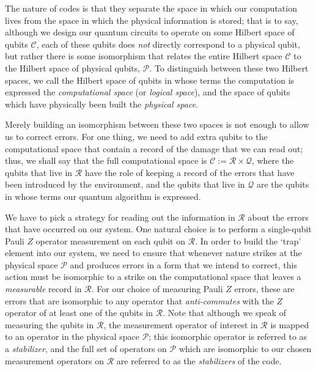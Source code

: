 \documentclass[12pt]{amsbook}
\theoremstyle{plain}
\theoremstyle{definition}
\theoremstyle{remark}
\begin{document}
The nature of codes is that they separate the space in which our computation lives from the space in which the physical information is
stored; that is to say, although we design our quantum circuits to operate on some Hilbert space of qubits $\mathscr{C}$, each of these qubits
does \emph{not} directly correspond to a physical qubit, but rather there is some isomorphism that relates the entire Hilbert space $\mathscr{C}$
to the Hilbert space of physical qubits, $\mathscr{P}$.  To distinguish between these two Hilbert spaces, we call the Hilbert space of qubits in whose terms the computation is expressed the \emph{computational space} (or \emph{logical space}), and the space of qubits which have physically been built the
\emph{physical space}.

Merely building an isomorphism between these two spaces is not enough to allow us to correct errors.  For one thing, we need to add extra qubits to the computational space that contain a record of the damage that we can read out; thus, we shall say that the full computational space is $\mathscr{C}:=\mathscr{R}\times\mathscr{Q}$, where the qubits that live in $\mathscr{R}$ have the role of keeping a
record of the errors that have been introduced by the environment, and the qubits that live in $\mathscr{Q}$ are the qubits in whose terms our quantum
algorithm is expressed.  

We have to pick a strategy for reading out the information in $\mathscr{R}$ about the errors that have occurred on our system.  One natural choice is to perform a single-qubit Pauli $Z$ operator measurement on each qubit on $\mathscr{R}$.  In order to build the `trap' element into our system, we need to ensure that whenever nature strikes at the physical space $\mathscr{P}$ and produces errors in a form that we intend to correct, this action must be isomorphic to a strike on the computational space that leaves a \emph{measurable} record in $\mathscr{R}$.  For our choice of measuring Pauli $Z$ errors, these are errors that are isomorphic to any operator that \emph{anti-commutes} with the $Z$ operator of at least one of the qubits in $\mathscr{R}$.  Note that although we speak of measuring the qubits in $\mathscr{R}$, the measurement operator of interest in $\mathscr{R}$ is mapped to an operator in the physical space $\mathscr{P}$; this isomorphic operator is referred to as a \emph{stabilizer}, and the full set of operators on $\mathscr{P}$ which are isomorphic to our chosen measurement operators on $\mathscr{R}$ are referred to as the \emph{stabilizers} of the code.
\end{document}
